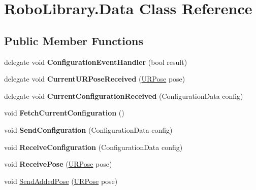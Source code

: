 \hypertarget{class_robo_library_1_1_data}{}\section{Robo\+Library.\+Data Class Reference}
\label{class_robo_library_1_1_data}
\subsection*{Public Member Functions}
\begin{DoxyCompactItemize}
\item 
\hypertarget{class_robo_library_1_1_data_ab82bf5ac661fb88659696f401b1a7037}{}\label{class_robo_library_1_1_data_ab82bf5ac661fb88659696f401b1a7037} 
delegate void {\bfseries Configuration\+Event\+Handler} (bool result)
\item 
\hypertarget{class_robo_library_1_1_data_ab6c5d04b89fa699ceaf7146d536e7c39}{}\label{class_robo_library_1_1_data_ab6c5d04b89fa699ceaf7146d536e7c39} 
delegate void {\bfseries Current\+U\+R\+Pose\+Received} (\hyperlink{class_robo_library_1_1_u_r_pose}{U\+R\+Pose} pose)
\item 
\hypertarget{class_robo_library_1_1_data_a864c51668e34cfdfc7fdc7f67b3446d3}{}\label{class_robo_library_1_1_data_a864c51668e34cfdfc7fdc7f67b3446d3} 
delegate void {\bfseries Current\+Configuration\+Received} (Configuration\+Data config)
\item 
\hypertarget{class_robo_library_1_1_data_a9678104c6f672405779f1791ae381d56}{}\label{class_robo_library_1_1_data_a9678104c6f672405779f1791ae381d56} 
void {\bfseries Fetch\+Current\+Configuration} ()
\item 
\hypertarget{class_robo_library_1_1_data_a01d102e84148fa4042d057f9fbcb5910}{}\label{class_robo_library_1_1_data_a01d102e84148fa4042d057f9fbcb5910} 
void {\bfseries Send\+Configuration} (Configuration\+Data config)
\item 
\hypertarget{class_robo_library_1_1_data_a37aa50807e1db0eff6ee48777fd384f8}{}\label{class_robo_library_1_1_data_a37aa50807e1db0eff6ee48777fd384f8} 
void {\bfseries Receive\+Configuration} (Configuration\+Data config)
\item 
\hypertarget{class_robo_library_1_1_data_af54d9c0ce4672dad475f25c49c4acae2}{}\label{class_robo_library_1_1_data_af54d9c0ce4672dad475f25c49c4acae2} 
void {\bfseries Receive\+Pose} (\hyperlink{class_robo_library_1_1_u_r_pose}{U\+R\+Pose} pose)
\item 
void \hyperlink{class_robo_library_1_1_data_a1e41bd63de43e5b386030d65825a4025}{Send\+Added\+Pose} (\hyperlink{class_robo_library_1_1_u_r_pose}{U\+R\+Pose} pose)

\end{DoxyCompactItemize}

